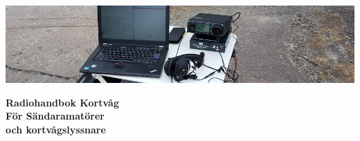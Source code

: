 \newcommand{\TitleText}{Radiohandbok Kortvåg}
\newcommand{\SubtitleText}{För Sändaramatörer\\ och kortvågslyssnare}
\newcommand{\Forfattare}{Täpp-Anders Sikvall}
\newcommand{\Initialer}{SMØUEI}
\newcommand{\DokYear}{19}
\newcommand{\DokVersion}{2.0.0}
\newcommand{\DokumentRevision}{x.y.z}
\newcommand{\DokumentDatum}{\today}


\renewcommand{\arraystretch}{1.15}

\titlefoottrue %



\pagestyle{empty}
\vfill
\vspace*{4cm}
\centerline{\includegraphics[width=\paperwidth]{logo/rubrikbild}}
\begin{flushright}
	\Huge{\bfseries{\TitleText}} \\[3mm]
	\Large{\bfseries{\SubtitleText}}
\end{flushright}

\vfill


